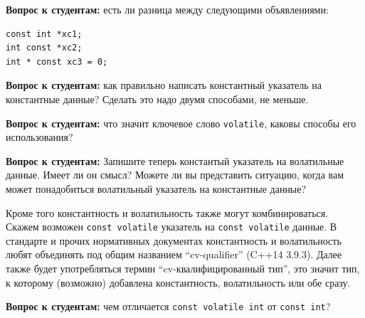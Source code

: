 \documentclass[a4paper,12pt,oneside]{article}
\newif\ifanswers
\begin{document}
\textbf{Вопрос к студентам:} есть ли разница между следующими объявлениями:

\begin{lstlisting}
const int *xc1;
int const *xc2;
int * const xc3 = 0;
\end{lstlisting}

\ifanswers
Ответ: между первым и вторым нет, между вторым и третьим очень существенная разница. Во втором случае (как и в первом) речь идёт о \textbf{не константном} указателе на константные данные. В третьем случае речь идёт о \textbf{константном} указателе на не константные данные. Объявляя константу нельзя оставить её неинициализированной, поэтому инициализатор выделяет строчку, где объявлен константный указатель. В то же время, указатель на константные данные сам может быть неконстантным и инициализации не требует (хотя она возможна).
\fi

\textbf{Вопрос к студентам:} как правильно написать константный указатель на константные данные? Сделать это надо двумя способами, не меньше.

\textbf{Вопрос к студентам:} что значит ключевое слово \lstinline!volatile!, каковы способы его использования?

\textbf{Вопрос к студентам:} Запишите теперь константый указатель на волатильные данные. Имеет ли он смысл? Можете ли вы представить ситуацию, когда вам может понадобиться волатильный указатель на константные данные?

\ifanswers
Ответы на первые два вопроса очевидны, но ответ на третий может быть несколько экзотичен: если этот указатель \lstinline!register! переменная, которая определяет область памяти откуда идёт чтение и которая при этом соответсвует не настоящему регистру а некоему устройству, притворяющемуся регистром, но допускающему смену состояний, то конструкция обретает смысл.
\fi

Кроме того константность и волатильность также могут комбинироваться. Скажем возможен \lstinline!const volatile! указатель на \lstinline!const volatile! данные. В стандарте и прочих нормативных документах константность и волатильность любят объединять под общим названием ``cv-qualifier'' (C++14 3.9.3). Далее также будет употребляться термин ``cv-квалифи\-цированный тип'', это значит тип, к которому (возможно) добавлена константность, волатильность или обе сразу.

\textbf{Вопрос к студентам:} чем отличается \lstinline!const volatile int! от \lstinline!const int!?
\end{document}

